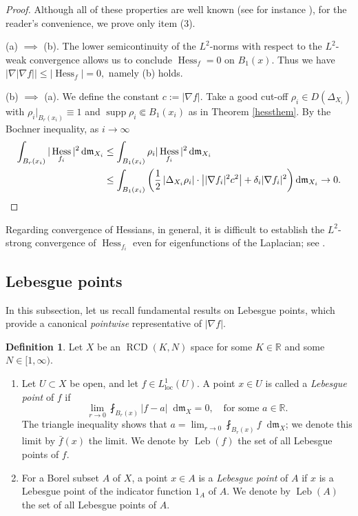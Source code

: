 \documentclass[11pt,reqno]{amsart}
\theoremstyle{definition}
\newtheorem{definition}[theorem]{Definition}
\numberwithin{equation}{section}
\newcommand{\di}{\mathop{}\!\mathrm{d}}
\newcommand{\meas}{\mathfrak{m}}
\DeclareMathOperator{\Hess}{Hess}
\DeclareMathOperator{\Leb}{Leb}
\DeclareMathOperator{\loc}{loc}
\DeclareMathOperator{\RCD}{RCD}
\DeclareMathOperator{\supp}{supp}
\begin{document}
\begin{proof}
Although all of these properties are well known (see for instance \cite{AmbrosioHonda, AmbrosioHonda2}), for the reader's convenience, we prove only item (3). 

  (a) $\implies$ (b). The lower semicontinuity of the $L^2$-norms with respect to the $L^2$-weak convergence allows us to conclude $\Hess_f=0$ on $B_1(x)$. Thus we have
$
    |\nabla |\nabla f|| \le |\Hess_f| =0,
$
namely (b) holds.

(b) $\implies$ (a).  We define the constant $c:= |\nabla f|$.  
Take a good cut-off $\rho_i \in D(\Delta_{X_i})$  with $\rho_i|_{B_r(x_i)} \equiv 1$ and $\supp \rho_i \Subset B_1(x_i)$ as in Theorem \ref{hessthem}.
By the Bochner inequality, as $i \to \infty$
\begin{align*}
\int_{B_r(x_i)}|\Hess_{f_i}|^2\di \meas_{X_i}&\le \int_{B_1(x_i)}\rho_i |\Hess_{f_i}|^2\di \meas_{X_i}\nonumber \\
& \le \int_{B_1(x_i)}\left(\frac{1}{2}\left|\Delta_{X_i}\rho_i\right| \cdot \left||\nabla f_i|^2 c^2 \right| +\delta_i|\nabla f_i|^2 \right)\di \meas_{X_i} \to 0. \qedhere
\end{align*}
\end{proof}
Regarding convergence of Hessians, 
 in general, it is difficult to establish the $L^2$-strong convergence of $\Hess_{f_i}$ even for eigenfunctions of the Laplacian; see \cite[Remark 10.6]{AmbrosioHonda}. 
\subsection{Lebesgue points}
In this subsection, let us recall fundamental results on Lebesgue points, which provide a canonical \textit{pointwise} representative of $|\nabla f|$.

\begin{definition}\label{lebesguedef}
Let $X$ be an $\RCD(K, N)$ space for some $K \in \mathbb{R}$ and some $N \in [1, \infty)$. 
\begin{enumerate}
    \item Let $U\subset X$ be open, and
    let $f \in L^1_{\loc}(U)$. A point $x \in U$ is called a \textit{Lebesgue point} of $f$ if 
    \begin{equation}
        \lim_{r\to 0}\fint_{B_r(x)}|f-a|\di \meas_X=0, \quad \text{for some $a \in \mathbb{R}$.}
    \end{equation}
The triangle inequality shows that $a=\lim_{r\to 0}\fint_{B_r(x)}f\di \meas_X$; we denote this limit by $\bar f(x)$ the limit.
    We denote by $\Leb (f)$ the set of all Lebesgue points of $f$.
    \item For a Borel subset $A$ of $X$, a point $x \in A$ is a \textit{Lebesgue point} of $A$ if $x$ is a Lebesgue point of the indicator function $1_A$ of $A$. We denote by $\Leb (A)$ the set of all Lebesgue points of $A$.
\end{enumerate}
\end{definition}
  
\end{document}
